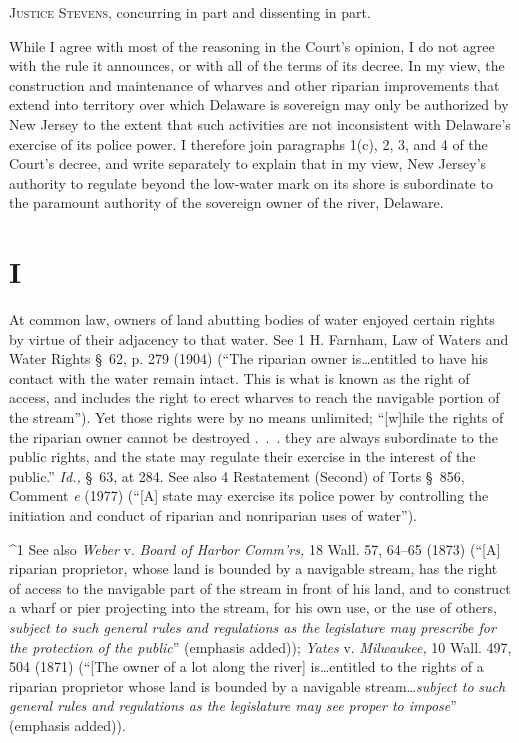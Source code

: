 
\setcounter{page}{624}

  \textsc{Justice Stevens,} concurring in part and dissenting in part.

  While I agree with most of the reasoning in the Court's opinion, I
do not agree with the rule it announces, or with all of the terms of its
decree. In my view, the construction \newpage  and maintenance of wharves
and other riparian improvements that extend into territory over which
Delaware is sovereign may only be authorized by New Jersey to the extent
that such activities are not inconsistent with Delaware's exercise of
its police power. I therefore join paragraphs 1(c), 2, 3, and 4 of the
Court's decree, and write separately to explain that in my view, New
Jersey's authority to regulate beyond the low-water mark on its shore
is subordinate to the paramount authority of the sovereign owner of the
river, Delaware.

\section{I}

  At common law, owners of land abutting bodies of water enjoyed
certain rights by virtue of their adjacency to that water. See 1 H.
Farnham, Law of Waters and Water Rights \S~62, p. 279 (1904) (``The
riparian owner is\dots entitled to have his contact with the water
remain intact. This is what is known as the right of access, and
includes the right to erect wharves to reach the navigable portion
of the stream''). Yet those rights were by no means unlimited;
``[w]hile the rights of the riparian owner cannot be destroyed .~.~.
they are always subordinate to the public rights, and the state may
regulate their exercise in the interest of the public.'' \emph{Id.,}
\S~63, at 284. See also 4 Restatement (Second) of Torts \S~856,
Comment \emph{e} (1977) (``[A] state may exercise its police power by
controlling the initiation and conduct of riparian and nonriparian uses
of water'').\footnotemark[1]\newpage 


^1 See also \emph{Weber} v. \emph{Board of Harbor Comm'rs,} 18 Wall. 57,
64--65 (1873) (``[A] riparian proprietor, whose land is bounded by a
navigable stream, has the right of access to the navigable part of the
stream in front of his land, and to construct a wharf or pier projecting
into the stream, for his own use, or the use of others, \emph{subject to
such general rules and regulations as the legislature may prescribe
for the protection of the public}'' (emphasis added)); \emph{Yates} v.
\emph{Milwaukee,} 10 Wall. 497, 504 (1871) (``[The owner of a lot along
the river] is\dots entitled to the rights of a riparian proprietor
whose land is bounded by a navigable stream\dots \emph{subject to}
\emph{such general rules and regulations as the legislature may see proper
to impose}'' (emphasis added)).

